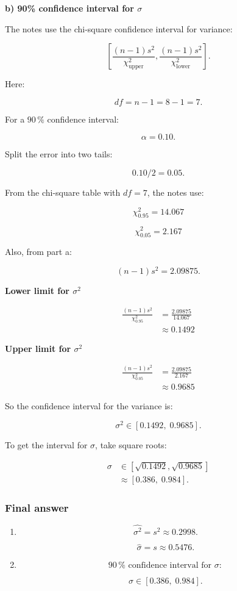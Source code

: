 \documentclass[10pt]{article}
\begin{document}
\textbf{b) 90\% confidence interval for $\sigma$}

The notes use the chi-square confidence interval for variance:

\[
\left[
\frac{(n-1)s^2}{\chi^2_{\text{upper}}},
\frac{(n-1)s^2}{\chi^2_{\text{lower}}}
\right].
\]

Here:

\[
df=n-1=8-1=7.
\]

For a $90\,\%$ confidence interval:

\[
\alpha=0.10.
\]

Split the error into two tails:

\[
0.10/2=0.05.
\]

From the chi-square table with $df=7$, the notes use:

\[
\chi^2_{0.95}=14.067
\]

\[
\chi^2_{0.05}=2.167
\]

Also, from part a:

\[
(n-1)s^2=2.09875.
\]

\textbf{Lower limit for $\sigma^2$}

\begin{align*}
\frac{(n-1)s^2}{\chi^2_{0.95}}
&=
\frac{2.09875}{14.067} \\[2mm]
&\approx 0.1492
\end{align*}

\textbf{Upper limit for $\sigma^2$}

\begin{align*}
\frac{(n-1)s^2}{\chi^2_{0.05}}
&=
\frac{2.09875}{2.167} \\[2mm]
&\approx 0.9685
\end{align*}

So the confidence interval for the variance is:

\[
\sigma^2\in [0.1492,\;0.9685].
\]

To get the interval for $\sigma$, take square roots:

\begin{align*}
\sigma
&\in
\left[
\sqrt{0.1492},
\sqrt{0.9685}
\right] \\[2mm]
&\approx
[0.386,\;0.984].
\end{align*}

\subsubsection*{Final answer}
\begin{enumerate}[label=\alph*)]
\item
\[
\widehat{\sigma^2}=s^2\approx 0.2998.
\]

\[
\hat{\sigma}=s\approx 0.5476.
\]

\item
\[
90\,\%\text{ confidence interval for }\sigma:
\]

\[
\sigma\in[0.386,\;0.984].
\]
\end{enumerate}
\end{document}
